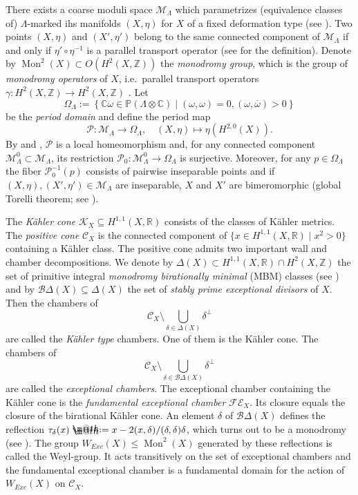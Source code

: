 \documentclass{amsart}
\makeatletter
\theoremstyle{definition}
\theoremstyle{plain}
\DeclareMathOperator{\Mo}{Mon}
\newcommand{\RR}{\mathbb{R}}
\newcommand{\CC}{\mathbb{C}}
\newcommand{\ZZ}{\mathbb{Z}}
\newcommand{\IZ}{\mathbb{Z}}
\newcommand{\K}{\mathcal{K}}
\newcommand{\C}{\mathcal{C}}
\newcommand{\B}{\mathcal{B}}
\newcommand*{\defeq}{\mathrel{\rlap{%
                     \raisebox{0.3ex}{$\m@th\cdot$}}%
                     \raisebox{-0.3ex}{$\m@th\cdot$}}%
                     =}
\makeatother
\begin{document}
There exists a coarse moduli space $\mathcal{M}_\Lambda$ which
parametrizes (equivalence classes of) $\Lambda$-marked ihs manifolds
$(X, \eta)$ for $X$ of a fixed deformation type
(see \cite{huybr_basic}). Two points $(X, \eta)$ and
$(X', \eta')$ belong to the same connected component of
$\mathcal{M}_\Lambda$ if and only if $\eta' \circ \eta^{-1}$ is
a parallel transport operator (see \cite[\S 1.1]{markman}
for the definition).
Denote by $\Mo^2(X) \subset O(H^2(X,\IZ))$ the
\emph{monodromy group}, which is the group of
\emph{monodromy operators} of $X$, i.e.\ parallel transport
operators $\gamma\colon H^2(X,\IZ) \rightarrow H^2(X,\IZ)$ .
Let
\[ \Omega_\Lambda := \left\{ \CC\omega \in \mathbb{P}(\Lambda \otimes \CC) \mid (\omega, \omega) = 0, (\omega, \overline{\omega}) > 0\right\}\]
be the \emph{period domain} and define the period map 
\[ \mathcal{P}: \mathcal{M}_\Lambda \rightarrow \Omega_\Lambda, \quad (X,\eta) \mapsto \eta(H^{2,0}(X)).\]
By \cite[Thm.\ 5]{beauville} and \cite[Thm.\ 8.1]{huybr_basic},
$\mathcal{P}$ is a local homeomorphism and, for any connected
component $\mathcal{M}_\Lambda^0 \subset \mathcal{M}_\Lambda$, its
restriction $\mathcal{P}_0: \mathcal{M}_\Lambda^0 \rightarrow
\Omega_\Lambda$ is surjective. Moreover, for any $p \in \Omega_\Lambda$
the fiber $\mathcal{P}_0^{-1}(p)$ consists of pairwise
inseparable points and if $(X, \eta), (X', \eta') \in \mathcal{M}_\Lambda$
are inseparable, $X$ and $X'$ are bimeromorphic (global Torelli theorem; see \cite[Theorem 2.2]{markman}).

The \emph{K\"ahler cone} $\K_X \subseteq H^{1,1}(X,\RR)$ consists of the classes of K\"ahler metrics.
The \emph{positive cone} $\C_X$
is the connected component of $\{x \in H^{1,1}(X,\RR) \mid x^2 >0\}$ containing a K\"ahler class.
The positive cone admits two important wall and chamber decompositions.
We denote by $\Delta(X) \subset H^{1,1}(X,\RR) \cap H^2(X,\ZZ)$ the set of primitive integral \emph{monodromy birationally minimal} (MBM) classes (see \cite[Def.\ 1.13]{amerik_verbitsky_mbm}) and by $\B \Delta(X)\subseteq \Delta(X)$ the set of \emph{stably prime exceptional divisors} of $X$. Then the chambers of
\[\C_X \setminus \bigcup_{\delta \in \Delta(X)} \delta^\perp\]
are called the \emph{K\"ahler type} chambers. One of them is the K\"ahler cone.
The chambers of
\[\C_X \setminus \bigcup_{\delta \in \B \Delta(X)} \delta^\perp\]
are called the \emph{exceptional chambers}. The exceptional chamber containing the K\"ahler cone is 
the \emph{fundamental exceptional chamber} $\mathcal{FE}_X$.
Its closure equals the closure of the birational K\"ahler cone.
An element $\delta$ of $\B \Delta(X)$ defines the reflection
$\tau_\delta(x)\defeq x - 2(x,\delta)/(\delta,\delta) \delta$,
which turns out to be a monodromy (see \cite[\S 6.2]{markman}). The group
$W_{Exc}(X) \leq \Mo^2(X)$ generated by these reflections
is called the Weyl-group.
It acts transitively
on the set of exceptional chambers and the fundamental exceptional
chamber is a fundamental domain for the action of
$W_{Exc}(X)$ on $\C_X$.
\end{document}
